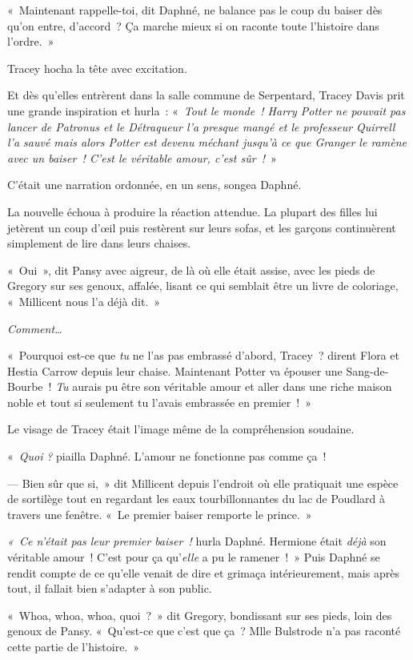 «~Maintenant rappelle-toi, dit Daphné, ne balance pas le coup du baiser dès qu'on entre, d'accord~? Ça marche mieux si on raconte toute l'histoire dans l'ordre.~»

Tracey hocha la tête avec excitation.

Et dès qu'elles entrèrent dans la salle commune de Serpentard, Tracey Davis prit une grande inspiration et hurla~: «~\emph{Tout le monde~! Harry Potter ne pouvait pas lancer de Patronus et le Détraqueur l'a presque mangé et le professeur Quirrell l'a sauvé mais alors Potter est devenu méchant jusqu'à ce que Granger le ramène avec un baiser~! C'est le véritable amour, c'est sûr~!}~»

C'était une narration ordonnée, en un sens, songea Daphné.

La nouvelle échoua à produire la réaction attendue. La plupart des filles lui jetèrent un coup d'œil puis restèrent sur leurs sofas, et les garçons continuèrent simplement de lire dans leurs chaises.

«~Oui~», dit Pansy avec aigreur, de là où elle était assise, avec les pieds de Gregory sur ses genoux, affalée, lisant ce qui semblait être un livre de coloriage, «~Millicent nous l'a déjà dit.~»

\emph{Comment…}

«~Pourquoi est-ce que \emph{tu} ne l'as pas embrassé d'abord, Tracey~? dirent Flora et Hestia Carrow depuis leur chaise. Maintenant Potter va épouser une Sang-de-Bourbe~! \emph{Tu} aurais pu être son véritable amour et aller dans une riche maison noble et tout si seulement tu l'avais embrassée en premier~!~»

Le visage de Tracey était l'image même de la compréhension soudaine.

«~\emph{Quoi} \emph{?} piailla Daphné. L'amour ne fonctionne pas comme ça~!

--- Bien sûr que si,~» dit Millicent depuis l'endroit où elle pratiquait une espèce de sortilège tout en regardant les eaux tourbillonnantes du lac de Poudlard à travers une fenêtre. «~Le premier baiser remporte le prince.~»

\emph{«~Ce n'était pas leur premier baiser~!} hurla Daphné. Hermione était \emph{déjà} son véritable amour~! C'est pour ça qu'\emph{elle} a pu le ramener~!~» Puis Daphné se rendit compte de ce qu'elle venait de dire et grimaça intérieurement, mais après tout, il fallait bien s'adapter à son public.

«~Whoa, whoa, whoa, quoi~?~» dit Gregory, bondissant sur ses pieds, loin des genoux de Pansy. «~Qu'est-ce que c'est que ça~? Mlle Bulstrode n'a pas raconté cette partie de l'histoire.~»

